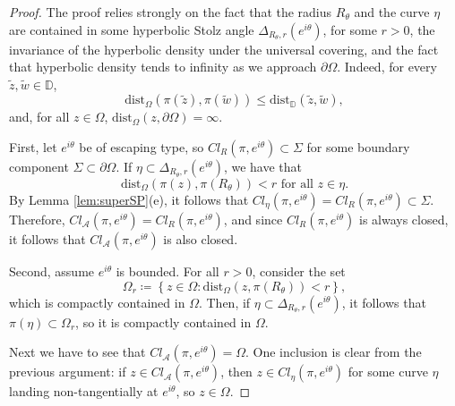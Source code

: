 \documentclass[11pt,a4paper,reqno]{amsart}
\theoremstyle{plain}
\theoremstyle{definition}
\theoremstyle{plain}
\def\DD{\mathbb{D}}
\def\dist{\mathrm{dist}}
\renewcommand{\tilde}{\widetilde}
\begin{document}
\begin{proof}
	The proof relies strongly on the fact that the radius $ R_\theta $ and the curve $ \eta $ are contained in some hyperbolic Stolz angle $ \Delta_{R_\theta, r} (e^{i\theta}) $, for some $ r>0 $, the invariance of the hyperbolic density under the universal covering, and the fact that hyperbolic density tends to infinity as we approach $ \partial \Omega $. Indeed, for every $ \tilde z,\tilde w\in\mathbb{D} $,
	\[ \textrm{dist}_\Omega (\pi(\tilde z),\pi(\tilde w))\leq \textrm{dist}_\DD(\tilde z,\tilde w) ,\] and, for all $ z\in\Omega $, $  \dist_\Omega(z, \partial\Omega)=\infty$.

	First, let $ e^{i\theta} $ be of escaping type, so $ Cl_{R}(\pi, e^{i\theta})\subset \Sigma $ for some boundary component $ \Sigma \subset\partial \Omega  $. If $ \eta \subset \Delta_{R_\theta, r} (e^{i\theta}) $, we have that
	$$\textrm{dist}_\Omega(\pi (z), \pi(R_\theta))<r \text{ for all $z\in\eta$}. $$
	By Lemma \ref{lem:superSP}(e), it follows that $ Cl_{\eta}(\pi, e^{i\theta})=Cl_{R}(\pi, e^{i\theta}) \subset \Sigma  $.
	Therefore, $ Cl_{\mathcal{A}}(\pi, e^{i\theta})= Cl_{R}(\pi, e^{i\theta}) $, and since $ Cl_{R}(\pi, e^{i\theta}) $ is always closed, it follows that $ Cl_{\mathcal{A}}(\pi, e^{i\theta}) $ is also closed.

	Second, assume $ e^{i\theta} $ is bounded. For all $ r>0 $, consider the set
	\[\Omega_r \coloneqq \left\lbrace z\in\Omega\colon \textrm{dist}_\Omega (z, \pi(R_\theta))<r\right\rbrace, \] which is compactly contained in $ \Omega $. Then, if $ \eta\subset \Delta_{R_\theta, r} (e^{i\theta})   $, it follows that $ \pi (\eta)\subset\Omega_r $, so it is compactly contained in $ \Omega $. 
	
	Next we have to see that  $ Cl_{\mathcal{A}}(\pi, e^{i\theta})=  \Omega $. One inclusion is clear from the previous argument: if $ z\in Cl_{\mathcal{A}}(\pi, e^{i\theta})$, then $ z\in Cl_{\eta}(\pi, e^{i\theta})$ for some curve  $ \eta $ landing non-tangentially at $ e^{i\theta} $, so $ z\in\Omega $.
	

\end{proof}
\end{document}
